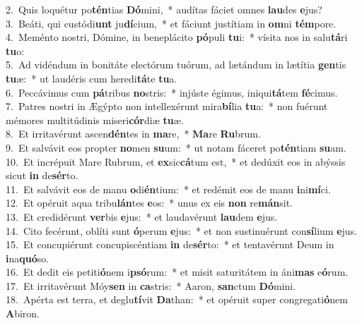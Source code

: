 {2.~}Quis loquétur po\textbf{tén}tias \textbf{Dó}mini,~* audítas fáciet omnes \textbf{lau}des \textbf{e}jus?\\
{3.~}Beáti, qui custódi\textbf{unt} ju\textbf{dí}cium,~* et fáciunt justítiam in \textbf{om}ni \textbf{tém}pore.\\
{4.~}Meménto nostri, Dómine, in beneplácito \textbf{pó}puli \textbf{tu}i:~* vísita nos in salu\textbf{tá}ri \textbf{tu}o:\\
{5.~}Ad vidéndum in bonitáte electórum tuórum, ad lætándum in lætítia \textbf{gen}tis \textbf{tu}æ:~* ut laudéris cum heredi\textbf{tá}te \textbf{tu}a.\\
{6.~}Peccávimus cum \textbf{pá}tribus \textbf{no}stris:~* injúste égimus, iniqui\textbf{tá}tem \textbf{fé}cimus.\\
{7.~}Patres nostri in Ægýpto non intellexérunt mira\textbf{bí}lia \textbf{tu}a:~* non fuérunt mémores multitúdinis miseri\textbf{cór}diæ \textbf{tu}æ.\\
{8.~}Et irritavérunt ascen\textbf{dén}tes in \textbf{ma}re,~* \textbf{Ma}re \textbf{Ru}brum.\\
{9.~}Et salvávit eos propter \textbf{no}men \textbf{su}um:~* ut notam fáceret po\textbf{tén}tiam \textbf{su}am.\\
{10.~}Et incrépuit Mare Rubrum, et \textbf{ex}sic\textbf{cá}tum est,~* et dedúxit eos in abýssis sicut \textbf{in} de\textbf{sér}to.\\
{11.~}Et salvávit eos de manu \textbf{o}di\textbf{én}tium:~* et redémit eos de manu \textbf{i}ni\textbf{mí}ci.\\
{12.~}Et opéruit aqua tribu\textbf{lán}tes \textbf{e}os:~* unus ex eis \textbf{non} re\textbf{mán}sit.\\
{13.~}Et credidérunt \textbf{ver}bis \textbf{e}jus:~* et laudavérunt \textbf{lau}dem \textbf{e}jus.\\
{14.~}Cito fecérunt, oblíti sunt \textbf{ó}perum \textbf{e}jus:~* et non sustinuérunt con\textbf{sí}lium \textbf{e}jus.\\
{15.~}Et concupiérunt concupiscéntiam \textbf{in} de\textbf{sér}to:~* et tentavérunt Deum in \textbf{i}na\textbf{quó}so.\\
{16.~}Et dedit eis petiti\textbf{ó}nem i\textbf{psó}rum:~* et misit saturitátem in áni\textbf{mas} e\textbf{ó}rum.\\
{17.~}Et irritavérunt Móy\textbf{sen} in \textbf{ca}stris:~* Aaron, \textbf{san}ctum \textbf{Dó}mini.\\
{18.~}Apérta est terra, et deglu\textbf{tí}vit \textbf{Da}than:~* et opéruit super congregati\textbf{ó}nem \textbf{A}biron.\\
